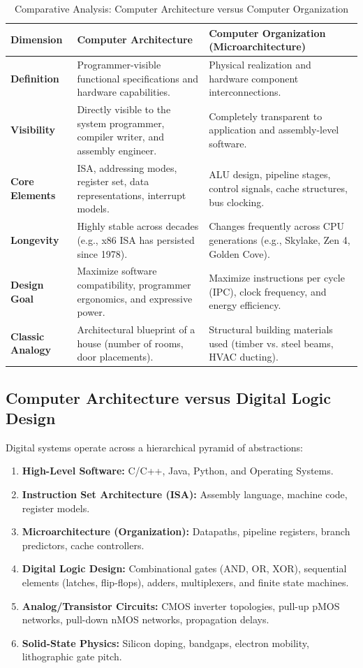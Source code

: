 \begin{table}[htbp]
\centering
\small
\caption{Comparative Analysis: Computer Architecture versus Computer Organization}
\label{tab:arch_vs_org}
\begin{tabularx}{\textwidth}{l X X}
\toprule
\textbf{Dimension} & \textbf{Computer Architecture} & \textbf{Computer Organization (Microarchitecture)} \\
\midrule
\textbf{Definition} & Programmer-visible functional specifications and hardware capabilities. & Physical realization and hardware component interconnections. \\
\textbf{Visibility} & Directly visible to the system programmer, compiler writer, and assembly engineer. & Completely transparent to application and assembly-level software. \\
\textbf{Core Elements} & ISA, addressing modes, register set, data representations, interrupt models. & ALU design, pipeline stages, control signals, cache structures, bus clocking. \\
\textbf{Longevity} & Highly stable across decades (e.g., x86 ISA has persisted since 1978). & Changes frequently across CPU generations (e.g., Skylake, Zen 4, Golden Cove). \\
\textbf{Design Goal} & Maximize software compatibility, programmer ergonomics, and expressive power. & Maximize instructions per cycle (IPC), clock frequency, and energy efficiency. \\
\textbf{Classic Analogy} & Architectural blueprint of a house (number of rooms, door placements). & Structural building materials used (timber vs. steel beams, HVAC ducting). \\
\bottomrule
\end{tabularx}
\end{table}

\subsection{Computer Architecture versus Digital Logic Design}
Digital systems operate across a hierarchical pyramid of abstractions:
\begin{enumerate}[label=\bfseries\arabic*.]
    \item \textbf{High-Level Software:} C/C++, Java, Python, and Operating Systems.
    \item \textbf{Instruction Set Architecture (ISA):} Assembly language, machine code, register models.
    \item \textbf{Microarchitecture (Organization):} Datapaths, pipeline registers, branch predictors, cache controllers.
    \item \textbf{Digital Logic Design:} Combinational gates (AND, OR, XOR), sequential elements (latches, flip-flops), adders, multiplexers, and finite state machines.
    \item \textbf{Analog/Transistor Circuits:} CMOS inverter topologies, pull-up pMOS networks, pull-down nMOS networks, propagation delays.
    \item \textbf{Solid-State Physics:} Silicon doping, bandgaps, electron mobility, lithographic gate pitch.
\end{enumerate}

